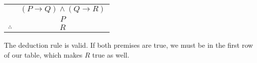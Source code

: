 \documentclass[12pt]{exam}
\def\imp{\rightarrow}
\begin{document}
\begin{questions}
   \begin{center}
     \begin{tabular}{lc}
       & $(P\imp Q) \wedge (Q \imp R)$ \\
       & $P$ \\ \hline
       $\therefore$ & $R$
     \end{tabular}
   \end{center}

   \begin{solution}
     The deduction rule is valid.  If both premises are true, we must be in the first row of our table, which makes $R$ true as well.  
   \end{solution}
   \vfill

 \end{questions}
\end{document}
